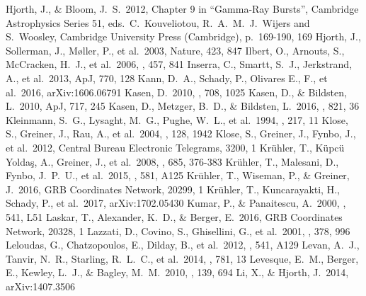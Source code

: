 \documentclass[traditabstract,longauth]{aa}
\begin{document}
\begin{thebibliography}{99}
 Hjorth, J., \& Bloom, J.~S.\ 2012, Chapter 9 in ``Gamma-Ray Bursts'', Cambridge Astrophysics Series 51,  eds.~C.~Kouveliotou, R.~A.~M.~J.~Wijers and S.~Woosley, Cambridge University Press (Cambridge), p.~169-190, 169 
 Hjorth, J., Sollerman, J., M{\o}ller, P., et al.\ 2003, Nature, 423, 847 
 Ilbert, O., Arnouts, S., McCracken, H.~J., et al.\ 2006, \aap, 457, 841 
 Inserra, C., Smartt, S.~J., Jerkstrand, A., et al.\ 2013, ApJ, 770, 128 
 Kann, D.~A., Schady, P., Olivares E., F., et al.\ 2016, arXiv:1606.06791 
 Kasen, D.\ 2010, \apj, 708, 1025 
 Kasen, D., \& Bildsten, L.\ 2010, ApJ, 717, 245 
 Kasen, D., Metzger, B.~D., \& Bildsten, L.\ 2016, \apj, 821, 36 
 Kleinmann, S.~G., Lysaght, M.~G., Pughe, W.~L., et al.\ 1994, \apss, 217, 11 
 Klose, S., Greiner, J., Rau, A., et al.\ 2004, \aj, 128, 1942 
 Klose, S., Greiner, J., Fynbo, J., et al.\ 2012, Central Bureau Electronic Telegrams, 3200, 1 
 Kr{\"u}hler, T., K{\"u}pc{\"u} Yolda{\c s}, A., Greiner, J., et al.\ 2008, \apj, 685, 376-383
 Kr{\"u}hler, T., Malesani, D., Fynbo, J.~P.~U., et al.\ 2015, \aap, 581, A125 
 Kr\"uhler, T., Wiseman, P., \& Greiner, J.\ 2016, GRB Coordinates Network, 20299, 1 
 Kr{\"u}hler, T., Kuncarayakti, H., Schady, P., et al.\ 2017, arXiv:1702.05430 
 Kumar, P., \& Panaitescu, A.\ 2000, \apjl, 541, L51 
 Laskar, T., Alexander, K.~D., \& Berger, E.\ 2016, GRB Coordinates Network, 20328, 1 
 Lazzati, D., Covino, S., Ghisellini, G., et al.\ 2001, \aap, 378, 996 
 Leloudas, G., Chatzopoulos, E., Dilday, B., et al.\ 2012, \aap, 541, A129 
 Levan, A.~J., Tanvir, N.~R., Starling, R.~L.~C., et al.\ 2014, \apj, 781, 13 
 Levesque, E.~M., Berger, E., Kewley, L.~J., \& Bagley, M.~M.\ 2010, \aj, 139, 694 
 Li, X., \& Hjorth, J.\ 2014, arXiv:1407.3506 

\end{thebibliography}
\end{document}
